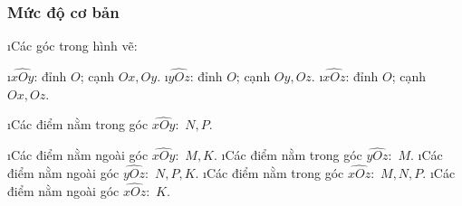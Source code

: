 \subsubsection*{Mức độ cơ bản}
\begin{bt}
	\begin{loigiaichuong30}
		\begin{enumerate}[a),leftmargin=*]
			\i Các góc trong hình vẽ:
			\begin{enumerate}[--,leftmargin=*]
				\i $\widehat{xOy}$: đỉnh $O$; cạnh $Ox,Oy$.
				\i $\widehat{yOz}$: đỉnh $O$; cạnh $Oy,Oz$.
				\i $\widehat{xOz}$: đỉnh $O$; cạnh $Ox,Oz$.
			\end{enumerate}
			\i Các điểm nằm trong góc $\widehat{xOy}:\,\,N,P$.
			\begin{enumerate}[--,leftmargin=*]
				\i Các điểm nằm ngoài góc $\widehat{xOy}:\,\,M,K$.
				\i Các điểm nằm trong góc $\widehat{yOz}:\,\,M$.
				\i Các điểm nằm ngoài góc $\widehat{yOz}:\,\,N,P,K$.
				\i Các điểm nằm trong góc $\widehat{xOz}:\,\,M,N,P$.
				\i Các điểm nằm ngoài góc $\widehat{xOz}:\,\,K$.
			\end{enumerate}
		\end{enumerate}
	\end{loigiaichuong30}
\end{bt}
